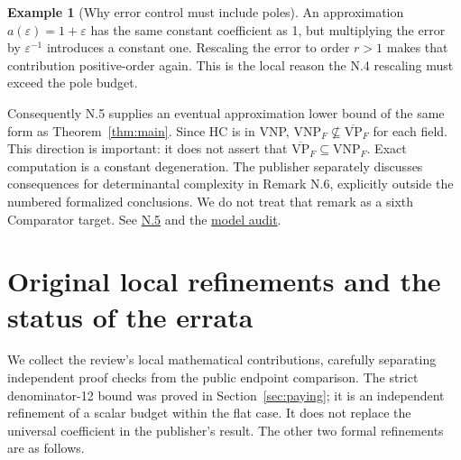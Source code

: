 \documentclass[11pt,letterpaper]{article}
\theoremstyle{definition}\newtheorem{definition}[theorem]{Definition}\newtheorem{example}[theorem]{Example}
\theoremstyle{remark}\newtheorem{remark}[theorem]{Remark}
\newcommand{\VNP}{\mathrm{VNP}}
\newcommand{\bVP}{\overline{\mathrm{VP}}}
\newcommand{\pub}[3]{\href{https://github.com/anthropics/formal-math/blob/11b6c7e3c927df2658f513b6b68ea7f8929c62c5/vp-vnp/#1\#L#2}{#3}}
\newcommand{\aud}[2]{\href{https://github.com/nousentllc/VP-VNP-Review/blob/567303d0bcf4f9d54390437b137752446e58ccd6/#1}{#2}}
\begin{document}
\begin{example}[Why error control must include poles]
An approximation $a(\varepsilon)=1+\varepsilon$ has the same constant coefficient as 1, but multiplying the error by $\varepsilon^{-1}$ introduces a constant one. Rescaling the error to order $r>1$ makes that contribution positive-order again. This is the local reason the N.4 rescaling must exceed the pole budget.
\end{example}
Consequently N.5 supplies an eventual approximation lower bound of the same form as Theorem~\ref{thm:main}. Since HC is in VNP, $\VNP_F\not\subseteq\bVP_F$ for each field. This direction is important: it does not assert that $\bVP_F\subseteq\VNP_F$. Exact computation is a constant degeneration. The publisher separately discusses consequences for determinantal complexity in Remark N.6, explicitly outside the numbered formalized conclusions. We do not treat that remark as a sixth Comparator target. See \pub{Paper/Approximate.lean}{266}{N.5} and the \aud{passes/statement-correspondence.md}{model audit}.

\section{Original local refinements and the status of the errata}\label{sec:extensions}
We collect the review's local mathematical contributions, carefully separating independent proof checks from the public endpoint comparison. The strict denominator-12 bound was proved in Section~\ref{sec:paying}; it is an independent refinement of a scalar budget within the flat case. It does not replace the universal coefficient in the publisher's result. The other two formal refinements are as follows.
\end{document}
